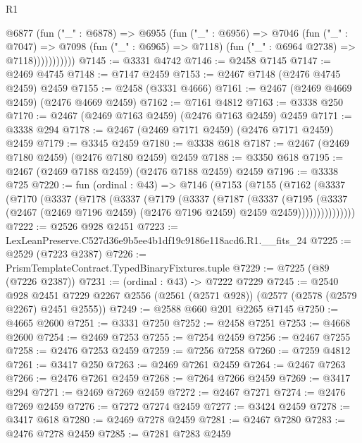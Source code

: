 \begin{lexlean}{R1}
\begin{coremodule}
                @6877
                  (fun ("_" : @6878) =>
                  @6955
                    (fun ("_" : @6956) =>
                    @7046
                      (fun ("_" : @7047) =>
                      @7098
                        (fun ("_" : @6965) => @7118)
                        (fun ("_" : @6964 @2738) => @7118)))))))))))
@7145 := @3331 @4742
@7146 := @2458 @7145
@7147 := @2469 @4745
@7148 := @7147 @2459
@7153 := @2467 @7148 (@2476 @4745 @2459) @2459
@7155 := @2458 (@3331 @4666)
@7161 := @2467 (@2469 @4669 @2459) (@2476 @4669 @2459)
@7162 := @7161 @4812
@7163 := @3338 @250
@7170 := @2467 (@2469 @7163 @2459) (@2476 @7163 @2459) @2459
@7171 := @3338 @294
@7178 := @2467 (@2469 @7171 @2459) (@2476 @7171 @2459) @2459
@7179 := @3345 @2459
@7180 := @3338 @618
@7187 := @2467 (@2469 @7180 @2459) (@2476 @7180 @2459) @2459
@7188 := @3350 @618
@7195 := @2467 (@2469 @7188 @2459) (@2476 @7188 @2459) @2459
@7196 := @3338 @725
@7220 := fun (ordinal : @43) =>
  @7146
    (@7153
      (@7155
        (@7162
          (@3337
            (@7170
              (@3337
                (@7178
                  (@3337
                    (@7179
                      (@3337
                        (@7187
                          (@3337
                            (@7195
                              (@3337
                                (@2467
                                  (@2469 @7196 @2459)
                                  (@2476 @7196 @2459)
                                  @2459
                                  @2459)))))))))))))))
@7222 := @2526 @928 @2451
@7223 := LexLeanPreserve.C527d36e9b5ee4b1df19c9186e118acd6.R1.__fits_24
@7225 := @2529 (@7223 @2387)
@7226 := PrismTemplateContract.TypedBinaryFixtures.tuple
@7229 := @7225 (@89 (@7226 @2387))
@7231 := (ordinal : @43) -> @7222 @7229
@7245 := @2540
    @928
    @2451
    @7229
    @2267
    @2556
    (@2561 (@2571 @928))
    (@2577 (@2578 (@2579 @2267) @2451 @2555))
@7249 := @2588 @660 @201 @2265 @7145
@7250 := @4665 @2600
@7251 := @3331 @7250
@7252 := @2458 @7251
@7253 := @4668 @2600
@7254 := @2469 @7253
@7255 := @7254 @2459
@7256 := @2467 @7255
@7258 := @2476 @7253 @2459
@7259 := @7256 @7258
@7260 := @7259 @4812
@7261 := @3417 @250
@7263 := @2469 @7261 @2459
@7264 := @2467 @7263
@7266 := @2476 @7261 @2459
@7268 := @7264 @7266 @2459
@7269 := @3417 @294
@7271 := @2469 @7269 @2459
@7272 := @2467 @7271
@7274 := @2476 @7269 @2459
@7276 := @7272 @7274 @2459
@7277 := @3424 @2459
@7278 := @3417 @618
@7280 := @2469 @7278 @2459
@7281 := @2467 @7280
@7283 := @2476 @7278 @2459
@7285 := @7281 @7283 @2459

\end{coremodule}
\end{lexlean}
